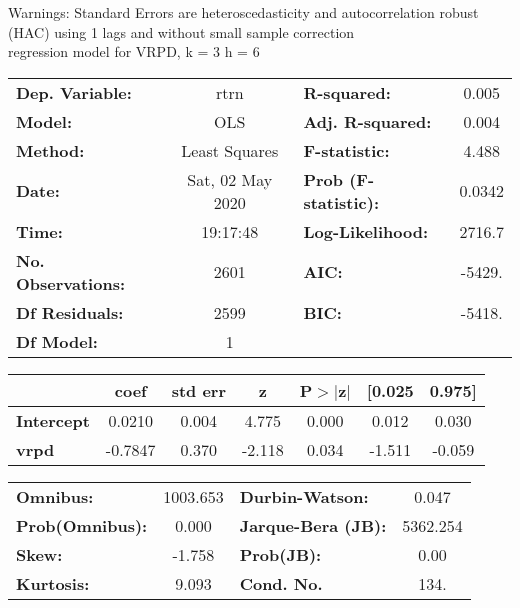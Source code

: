Warnings: \newline
 [1] Standard Errors are heteroscedasticity and autocorrelation robust (HAC) using 1 lags and without small sample correction\\ 

regression model for VRPD, k = 3 h = 6\begin{center}
\begin{tabular}{lclc}
\toprule
\textbf{Dep. Variable:}    &       rtrn       & \textbf{  R-squared:         } &     0.005   \\
\textbf{Model:}            &       OLS        & \textbf{  Adj. R-squared:    } &     0.004   \\
\textbf{Method:}           &  Least Squares   & \textbf{  F-statistic:       } &     4.488   \\
\textbf{Date:}             & Sat, 02 May 2020 & \textbf{  Prob (F-statistic):} &   0.0342    \\
\textbf{Time:}             &     19:17:48     & \textbf{  Log-Likelihood:    } &    2716.7   \\
\textbf{No. Observations:} &        2601      & \textbf{  AIC:               } &    -5429.   \\
\textbf{Df Residuals:}     &        2599      & \textbf{  BIC:               } &    -5418.   \\
\textbf{Df Model:}         &           1      & \textbf{                     } &             \\
\bottomrule
\end{tabular}
\begin{tabular}{lcccccc}
                   & \textbf{coef} & \textbf{std err} & \textbf{z} & \textbf{P$> |$z$|$} & \textbf{[0.025} & \textbf{0.975]}  \\
\midrule
\textbf{Intercept} &       0.0210  &        0.004     &     4.775  &         0.000        &        0.012    &        0.030     \\
\textbf{vrpd}      &      -0.7847  &        0.370     &    -2.118  &         0.034        &       -1.511    &       -0.059     \\
\bottomrule
\end{tabular}
\begin{tabular}{lclc}
\textbf{Omnibus:}       & 1003.653 & \textbf{  Durbin-Watson:     } &    0.047  \\
\textbf{Prob(Omnibus):} &   0.000  & \textbf{  Jarque-Bera (JB):  } & 5362.254  \\
\textbf{Skew:}          &  -1.758  & \textbf{  Prob(JB):          } &     0.00  \\
\textbf{Kurtosis:}      &   9.093  & \textbf{  Cond. No.          } &     134.  \\
\bottomrule
\end{tabular}
\end{center}

